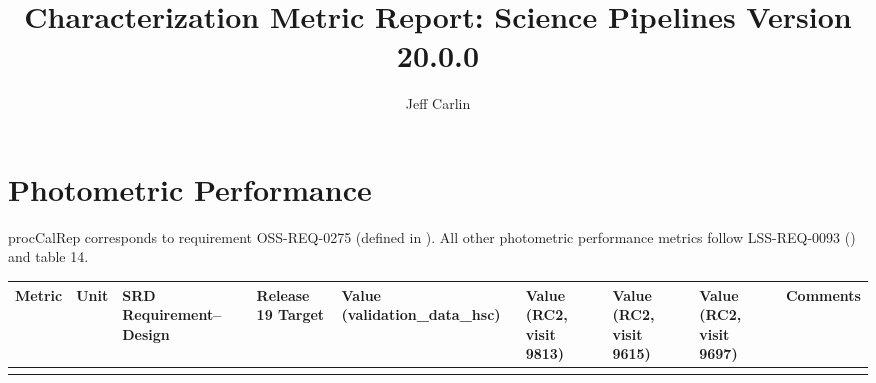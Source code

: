 \documentclass[DM,lsstdraft,toc]{lsstdoc}
\title{Characterization Metric Report: Science Pipelines Version 20.0.0}
\author{%
Jeff Carlin
}
\date{\vcsDate}
\begin{document}
\maketitle


\section{Photometric Performance}\label{photometric-performance}


procCalRep corresponds to requirement OSS-REQ-0275 (defined in
). All other photometric performance
metrics follow LSS-REQ-0093 () and
 table 14.

\begin{longtable}[]{@{}lllllllll@{}}
\toprule
\begin{minipage}[b]{0.12\columnwidth}\raggedright\strut
Metric\strut
\end{minipage} & \begin{minipage}[b]{0.06\columnwidth}\raggedright\strut
Unit\strut
\end{minipage} & \begin{minipage}[b]{0.10\columnwidth}\raggedright\strut
SRD Requirement--Design\strut
\end{minipage} & \begin{minipage}[b]{0.10\columnwidth}\raggedright\strut
Release 19 Target\strut
\end{minipage} & \begin{minipage}[b]{0.10\columnwidth}\raggedright\strut
Value (validation\_data\_hsc) \strut
\end{minipage} & \begin{minipage}[b]{0.10\columnwidth}\raggedright\strut
Value (RC2, visit 9813) \strut
\end{minipage} & \begin{minipage}[b]{0.10\columnwidth}\raggedright\strut
Value (RC2, visit 9615) \strut
\end{minipage} & \begin{minipage}[b]{0.10\columnwidth}\raggedright\strut
Value (RC2, visit 9697) \strut
\end{minipage} & \begin{minipage}[b]{0.18\columnwidth}\raggedright\strut
Comments\strut
\end{minipage}\tabularnewline
\midrule
\endhead
\begin{minipage}[t]{0.12\columnwidth}\raggedright\strut

\end{minipage}
\end{longtable}
\end{document}
